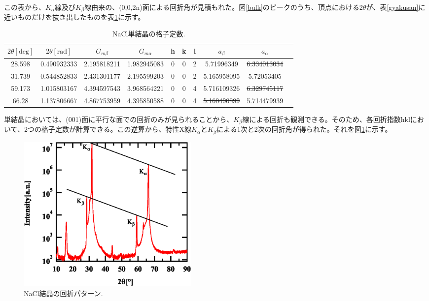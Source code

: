 \documentclass[11pt,a4j,uplatex]{jsarticle}
\begin{document}
\newpage
この表から、$K_\alpha$線及び$K_\beta$線由来の、(0,0,2n)面による回折角が見積もれた。図\ref{bulk}のピークのうち、頂点における2$\theta$が、表\ref{gyakusan}に近いものだけを抜き出したものを表\ref{crystal}に示す。

\begin{table}[htbp]
 \begin{center}
  \caption{NaCl単結晶の格子定数.}
  \begin{tabular}{|c|c|c|c|ccc|c|c|c|}  \hline
   $2\theta[\mathrm{deg}]$ & $2\theta[\mathrm{rad}]$ & $G_{m\beta}$ & $G_{m\alpha}$ & h & k & l & $a_\beta$   & $a_\alpha$        \\   \hline  \hline
   28.598                  & 0.490932333             & 2.195818211  & 1.982945083   & 0 & 0 & 2 & 5.71996349  & \sout{6.334013034}  \\
   31.739                  & 0.544852833             & 2.431301177  & 2.195599203   & 0 & 0 & 2 & \sout{5.165958095} & 5.72053405 \\
   59.173                  & 1.015803167             & 4.394597543  & 3.968564221   & 0 & 0 & 4 & 5.716109326 & \sout{6.329745117} \\
   66.28                   & 1.137806667             & 4.867753959  & 4.395850588   & 0 & 0 & 4 & \sout{5.160490899} & 5.714479939 \\  \hline
  \end{tabular}
  \label{crystal}
 \end{center}
\end{table}

単結晶においては、(001)面に平行な面での回折のみが見られることから、$K_\beta$線による回折も観測できる。そのため、各回折指数hklにおいて、2つの格子定数が計算できる。この逆算から、特性X線$K_\alpha$と$K_\beta$による1次と2次の回折角が得られた。それを図\ref{kakb}に示す。

\begin{figure}[htb]
 \centering
 \includegraphics[clip,width=9cm]{kakb.eps}
 \caption{NaCl結晶の回折パターン.}
 \label{kakb}
\end{figure}
\end{document}
